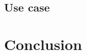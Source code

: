 \documentclass{CRPITStyle}
\renewcommand{\cite}{\citep}
\begin{document}
\subsection{Use case}




\cite{nosql_performance}

\section{Conclusion}




\end{document}

